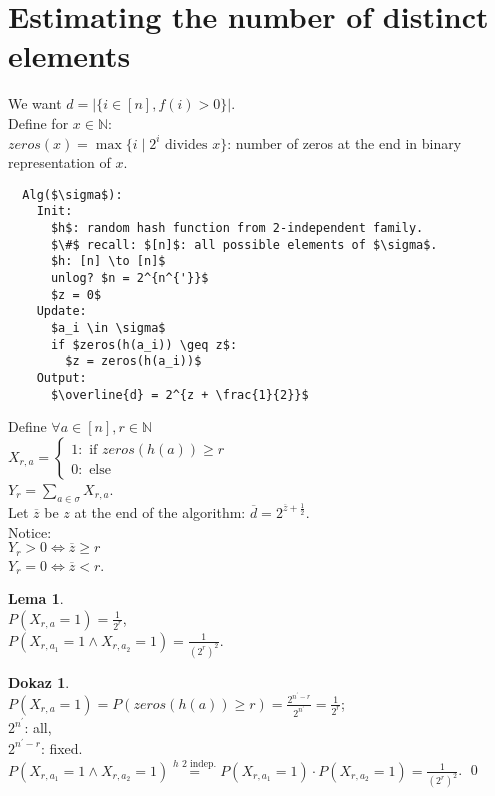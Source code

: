 \documentclass[a4paper, 12pt]{book}
\theoremstyle{definition}
\newtheorem{lemma}[counter]{Lema}
\newtheorem{pro}[counter]{Dokaz}
\theoremstyle{remark}
\newcommand{\N}{\mathbb{N}}
\begin{document}

\section{Estimating the number of distinct elements}

We want $d = |\{i \in [n], f(i) > 0\}|$. \\
Define for $x \in \N$: \\
$zeros(x) = \max \{i \mid 2^i \text{ divides } x\}$: number of zeros at the end in binary representation of $x$.
\begin{lstlisting}
  Alg($\sigma$):
    Init:
      $h$: random hash function from 2-independent family.
      $\#$ recall: $[n]$: all possible elements of $\sigma$.
      $h: [n] \to [n]$
      unlog? $n = 2^{n^{'}}$
      $z = 0$
    Update:
      $a_i \in \sigma$
      if $zeros(h(a_i)) \geq z$:
        $z = zeros(h(a_i))$
    Output:
      $\overline{d} = 2^{z + \frac{1}{2}}$
\end{lstlisting}
Define $\forall a \in [n], r \in \N$ \\
$X_{r, a} = \begin{cases}
  1: \text{ if } zeros(h(a)) \geq r \\
  0: \text{ else}
\end{cases}$ \\
$Y_r = \sum_{a \in \sigma} X_{r, a}$. \\
Let $\overline{z}$ be $z$ at the end of the algorithm: $\overline{d} = 2^{\overline{z} + \frac{1}{2}}$. \\
Notice: \\
$Y_r > 0 \iff \overline{z} \geq r$ \\
$Y_r = 0 \iff \overline{z} < r$.
\begin{lemma} \text{} \\
  $P(X_{r, a} = 1) = \frac{1}{2^r}$, \\
  $P(X_{r, a_1} = 1 \land X_{r, a_2} = 1) = \frac{1}{\left(2^r\right)^2}$.
\end{lemma}
\begin{pro} \text{} \\
  $P(X_{r, a} = 1) = P(zeros(h(a)) \geq r) = \frac{2^{n^{'}-r}}{2^{n^{'}}} = \frac{1}{2^r}$; \\
  $2^{n^{'}}$: all, \\
  $2^{n^{'}-r}$: fixed. \\
  $P(X_{r, a_1} = 1 \land X_{r, a_2} = 1) \stackrel{h \text{ 2 indep.}}{=}
  P(X_{r, a_1} = 1) \cdot P(X_{r, a_2} = 1) = \frac{1}{\left(2^r\right)^2}$.
  \qed
\end{pro}
\end{document}
